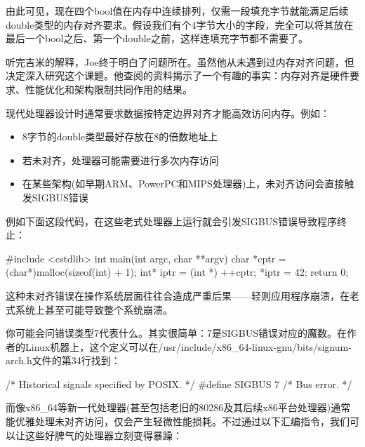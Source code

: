 由此可见，现在四个bool值在内存中连续排列，仅需一段填充字节就能满足后续double类型的内存对齐要求。假设我们有个4字节大小的字段，完全可以将其放在最后一个bool之后、第一个double之前，这样连填充字节都不需要了。

听完吉米的解释，Joe终于明白了问题所在。虽然他从未遇到过内存对齐问题，但决定深入研究这个课题。他查阅的资料揭示了一个有趣的事实：内存对齐是硬件要求、性能优化和架构限制共同作用的结果。

现代处理器设计时通常要求数据按特定边界对齐才能高效访问内存。例如：

\begin{itemize}
\item 
8字节的double类型最好存放在8的倍数地址上

\item 
若未对齐，处理器可能需要进行多次内存访问

\item 
在某些架构(如早期ARM、PowerPC和MIPS处理器)上，未对齐访问会直接触发SIGBUS错误
\end{itemize}

例如下面这段代码，在这些老式处理器上运行就会引发SIGBUS错误导致程序终止：

\begin{cpp}
#include <cstdlib>
  int main(int argc, char **argv) {
  char *cptr = (char*)malloc(sizeof(int) + 1);
  int* iptr = (int *) ++cptr;
  *iptr = 42;
  return 0;
}
\end{cpp}

这种未对齐错误在操作系统层面往往会造成严重后果——轻则应用程序崩溃，在老式系统上甚至可能导致整个系统崩溃。


你可能会问错误类型7代表什么。其实很简单：7是SIGBUS错误对应的魔数。在作者的Linux机器上，这个定义可以在/usr/include/x86\_64-linux-gnu/bits/signum-arch.h文件的第34行找到：

\begin{cpp}
/* Historical signals specified by POSIX. */
#define SIGBUS         7    /* Bus error. */
\end{cpp}

而像x86\_64等新一代处理器(甚至包括老旧的80286及其后续x86平台处理器)通常能优雅处理未对齐访问，仅会产生轻微性能损耗。不过通过以下汇编指令，我们可以让这些好脾气的处理器立刻变得暴躁：

